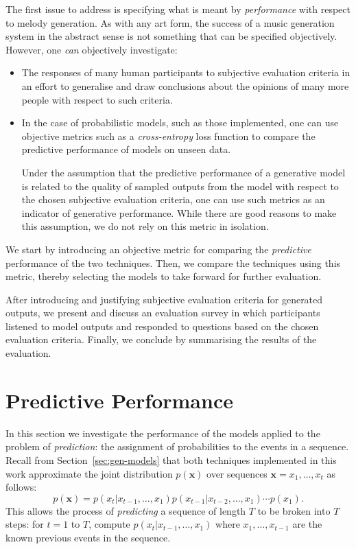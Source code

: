 \documentclass[12pt,a4paper,twoside,openright]{report}
\newcommand{\vect}[1]{\boldsymbol{\mathbf{#1}}}
\begin{document}
The first issue to address is specifying what is meant by \emph{performance}
with respect to melody generation. As with any art form, the success of a music
generation system in the abstract sense is not something that can be specified
objectively. However, one \emph{can} objectively investigate:
\begin{itemize}
  \item The responses of many human participants to subjective evaluation
    criteria in an effort to generalise and draw conclusions about the opinions
    of many more people with respect to such criteria.  
  \item In the case of probabilistic models, such as those implemented, one can
    use objective metrics such as a \emph{cross-entropy} loss function to
    compare the predictive performance of models on unseen data. 

    Under the assumption that the predictive performance of a generative model
    is related to the quality of sampled outputs from the model with respect to
    the chosen subjective evaluation criteria, one can use such metrics as an
    indicator of generative performance. While there are good reasons to make
    this assumption, we do not rely on this metric in isolation.
\end{itemize}

\vspace{4mm}

We start by introducing an objective metric for comparing the \emph{predictive}
performance of the two techniques. Then, we compare the techniques using this
metric, thereby selecting the models to take forward for further evaluation. 

After introducing and justifying subjective evaluation criteria for generated
outputs, we present and discuss an evaluation survey in which participants
listened to model outputs and responded to questions based on the chosen
evaluation criteria. Finally, we conclude by summarising the results of the
evaluation.

\section{Predictive Performance}

In this section we investigate the performance of the models applied to the
problem of \emph{prediction}: the assignment of probabilities to the events in a
sequence. Recall from Section~\ref{sec:gen-models} that both techniques
implemented in this work approximate the joint distribution $p(\vect{x})$ over
sequences $\vect{x} = x_1,\ldots,x_t$ as follows:
$$ p(\vect{x}) = p(x_t | x_{t-1}, \ldots, x_1) p(x_{t-1} | x_{t-2}, \ldots, x_1)
\cdots p(x_1). $$
This allows the process of \emph{predicting} a sequence of length $T$ to be
broken into $T$ steps: for $t = 1$ to $T$, compute $p(x_t | x_{t-1}, \ldots,
x_1)$ where $x_1, \ldots, x_{t-1}$ are the known previous events in the
sequence. 
\end{document}
